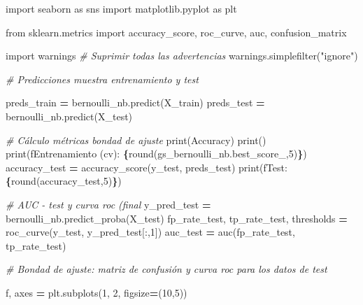 \documentclass[
  a4paper,
  DIV=11,
  numbers=noendperiod]{scrreprt}
\newenvironment{Shaded}{\begin{snugshade}}{\end{snugshade}}
\newcommand{\BuiltInTok}[1]{#1}
\newcommand{\CommentTok}[1]{\textcolor[rgb]{0.56,0.35,0.01}{\textit{#1}}}
\newcommand{\DecValTok}[1]{\textcolor[rgb]{0.00,0.00,0.81}{#1}}
\newcommand{\ImportTok}[1]{#1}
\newcommand{\NormalTok}[1]{#1}
\newcommand{\OperatorTok}[1]{\textcolor[rgb]{0.81,0.36,0.00}{\textbf{#1}}}
\newcommand{\SpecialCharTok}[1]{\textcolor[rgb]{0.81,0.36,0.00}{\textbf{#1}}}
\newcommand{\SpecialStringTok}[1]{\textcolor[rgb]{0.31,0.60,0.02}{#1}}
\newcommand{\StringTok}[1]{\textcolor[rgb]{0.31,0.60,0.02}{#1}}
\begin{document}
\begin{Shaded}
\begin{Highlighting}[numbers=left,,]
\ImportTok{import}\NormalTok{ seaborn }\ImportTok{as}\NormalTok{ sns}
\ImportTok{import}\NormalTok{ matplotlib.pyplot }\ImportTok{as}\NormalTok{ plt}

\ImportTok{from}\NormalTok{ sklearn.metrics }\ImportTok{import}\NormalTok{ accuracy\_score, roc\_curve, auc, confusion\_matrix}

\ImportTok{import}\NormalTok{ warnings}
\CommentTok{\# Suprimir todas las advertencias}
\NormalTok{warnings.simplefilter(}\StringTok{"ignore"}\NormalTok{)}


\CommentTok{\# Predicciones muestra entrenamiento y test}

\NormalTok{preds\_train }\OperatorTok{=}\NormalTok{ bernoulli\_nb.predict(X\_train)}
\NormalTok{preds\_test }\OperatorTok{=}\NormalTok{ bernoulli\_nb.predict(X\_test)}

\CommentTok{\# Cálculo métricas bondad de ajuste }
\BuiltInTok{print}\NormalTok{(}\StringTok{\textquotesingle{}Accuracy\textquotesingle{}}\NormalTok{)}
\BuiltInTok{print}\NormalTok{(}\StringTok{\textquotesingle{}{-}{-}{-}{-}{-}{-}{-}{-}{-}{-}{-}{-}{-}{-}{-}{-}{-}{-}{-}{-}{-}{-}{-}{-}{-}{-}{-}{-}{-}{-}\textquotesingle{}}\NormalTok{)}
\BuiltInTok{print}\NormalTok{(}\SpecialStringTok{f\textquotesingle{}Entrenamiento (cv): }\SpecialCharTok{\{}\BuiltInTok{round}\NormalTok{(gs\_bernoulli\_nb.best\_score\_,}\DecValTok{5}\NormalTok{)}\SpecialCharTok{\}}\SpecialStringTok{\textquotesingle{}}\NormalTok{)}
\NormalTok{accuracy\_test }\OperatorTok{=}\NormalTok{ accuracy\_score(y\_test, preds\_test)}
\BuiltInTok{print}\NormalTok{(}\SpecialStringTok{f\textquotesingle{}Test: }\SpecialCharTok{\{}\BuiltInTok{round}\NormalTok{(accuracy\_test,}\DecValTok{5}\NormalTok{)}\SpecialCharTok{\}}\SpecialStringTok{\textquotesingle{}}\NormalTok{)}

\CommentTok{\# AUC {-} test y curva roc (final}
\NormalTok{y\_pred\_test }\OperatorTok{=}\NormalTok{ bernoulli\_nb.predict\_proba(X\_test)}
\NormalTok{fp\_rate\_test, tp\_rate\_test, thresholds }\OperatorTok{=}\NormalTok{ roc\_curve(y\_test, y\_pred\_test[:,}\DecValTok{1}\NormalTok{])}
\NormalTok{auc\_test }\OperatorTok{=}\NormalTok{ auc(fp\_rate\_test, tp\_rate\_test)}

\CommentTok{\# Bondad de ajuste: matriz de confusión y curva roc para los datos de test}

\NormalTok{f, axes }\OperatorTok{=}\NormalTok{ plt.subplots(}\DecValTok{1}\NormalTok{, }\DecValTok{2}\NormalTok{, figsize}\OperatorTok{=}\NormalTok{(}\DecValTok{10}\NormalTok{,}\DecValTok{5}\NormalTok{))}


\end{Highlighting}
\end{Shaded}
\end{document}
